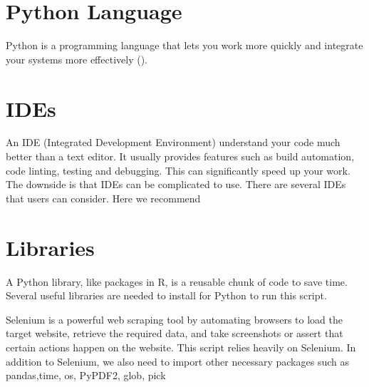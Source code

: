 \documentclass[letterpaper,10pt,english]{jupyterBook}
\begin{document}
\section{Python Language}
\label{\detokenize{ch1:python-language}}
\sphinxAtStartPar
Python is a programming language that lets you work more quickly and integrate your systems more effectively ().


\section{IDEs}
\label{\detokenize{ch1:ides}}
\sphinxAtStartPar
An IDE (Integrated Development Environment) understand your code much better than a text editor. It usually provides features such as build automation, code linting, testing and debugging. This can significantly speed up your work. The downside is that IDEs can be complicated to use. There are several IDEs that users can consider. Here we recommend


\section{Libraries}
\label{\detokenize{ch1:libraries}}
\sphinxAtStartPar
A Python library, like packages in R, is a reusable chunk of code to save time. Several useful libraries are needed to install for Python to run this script.

\sphinxAtStartPar
Selenium is a powerful web scraping tool by automating browsers to load the target website, retrieve the required data, and take screenshots or assert that certain actions happen on the website. This script relies heavily on Selenium. In addition to Selenium, we also need to import other necessary packages such as pandas,time, os, PyPDF2, glob, pick
\end{document}
